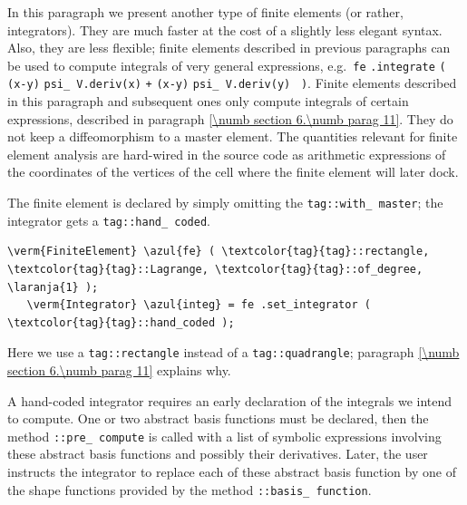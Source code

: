 In this paragraph we present another type of finite elements (or rather, integrators).
They are much faster at the cost of a slightly less elegant syntax.
Also, they are less flexible; finite elements described in previous paragraphs can be used
to compute integrals of very general expressions, e.g.\ {\small\tt fe} {\small\tt .integrate}
{\small\tt(} {\small\tt{}} {\small\tt(x-y)} {\small\tt *} {\small\tt psi\_\,V.deriv(x)}
{\small\tt +} {\small\tt{}} {\small\tt(x-y)} {\small\tt *} {\small\tt psi\_\,V.deriv(y)}%
~{\small\tt )}.
Finite elements described in this paragraph and subsequent ones only compute integrals
of certain expressions, described in paragraph \ref{\numb section 6.\numb parag 11}.
They do not keep a diffeomorphism to a master element.
The quantities relevant for finite element analysis are hard-wired in the source code
as arithmetic expressions
of the coordinates of the vertices of the cell where the finite element will later dock.

The finite element is declared by simply omitting the
{\small\tt\textcolor{tag}{tag}::with\_\,master}; the integrator gets a
{\small\tt\textcolor{tag}{tag}::hand\_\,coded}.

\begin{Verbatim}[commandchars=\\\{\},formatcom=\small\tt,frame=single,
   label=parag-\ref{\numb section 6.\numb parag 10}.cpp,rulecolor=\color{moldura},
   baselinestretch=0.94,framesep=2mm                                            ]
   \verm{FiniteElement} \azul{fe} ( \textcolor{tag}{tag}::rectangle, \textcolor{tag}{tag}::Lagrange, \textcolor{tag}{tag}::of_degree, \laranja{1} );
   \verm{Integrator} \azul{integ} = fe .set_integrator ( \textcolor{tag}{tag}::hand_coded );
\end{Verbatim}

Here we use a {\small\tt\textcolor{tag}{tag}::rectangle} instead of
a {\small\tt\textcolor{tag}{tag}::quadrangle};
paragraph \ref{\numb section 6.\numb parag 11} explains why.

A hand-coded integrator requires an early declaration of the integrals we intend to compute.
One or two abstract basis functions must be declared, then the method
{\small\tt{}::pre\_\,compute} is called
with a list of symbolic expressions
involving these abstract basis functions and possibly their derivatives.
Later, the user instructs the integrator to replace each of these abstract basis function
by one of the shape functions provided by the method
{\small\tt{}::basis\_\,function}.

